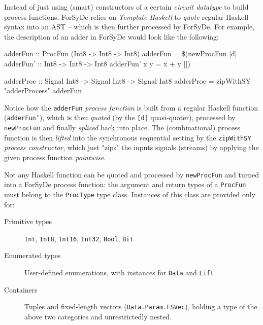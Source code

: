             Instead of just using (smart) constructors of a certain \emph{circuit datatype} to build
            process functions, ForSyDe relies on \emph{Template Haskell} to
            \emph{quote} regular Haskell syntax into an \ac{AST} – which is then further processed by ForSyDe.
            For example, the description of an adder in ForSyDe would look like the following:

            \begin{haskellcode}
        adderFun :: ProcFun (Int8 -> Int8 -> Int8)
        adderFun = \$(newProcFun [d|
                adderFun' :: Int8 -> Int8 -> Int8
                adderFun' x y = x + y
            |])

        adderProc :: Signal Int8 -> Signal Int8 -> Signal Int8
        adderProc = zipWithSY "adderProcess" adderFun
            \end{haskellcode}

            Notice how the \texttt{adderFun} \emph{process function} is built from a regular Haskell function
            (\texttt{adderFun'}), which is then \emph{quoted} (by the \texttt{[d|} quasi-quoter),
            processed by \texttt{newProcFun} and finally \emph{spliced} back into place.
            The (combinational) process function is then \emph{lifted} into the synchronous sequential setting
            by the \texttt{zipWithSY} \emph{process constructor},
            which just "zips" the inputs signals (streams) by applying the given process function \emph{pointwise}.

            Not any Haskell function can be quoted and processed by \texttt{newProcFun}
            and turned into a ForSyDe process function:
            the argument and return types of a \texttt{ProcFun} must belong
            to the \texttt{ProcType} type class.
            Instances of this class are provided only for:

            \begin{description}
                \item[Primitive types] \texttt{Int}, \texttt{Int8}, \texttt{Int16},
                    \texttt{Int32}, \texttt{Bool}, \texttt{Bit}
                \item[Enumerated types] User-defined enumerations,
                    with instances for \texttt{Data} and \texttt{Lift}
                \item[Containers] Tuples and fixed-length vectors (\texttt{Data.Param.FSVec}),
                    holding a type of the above two categories and unrestrictedly nested.
            \end{description}

